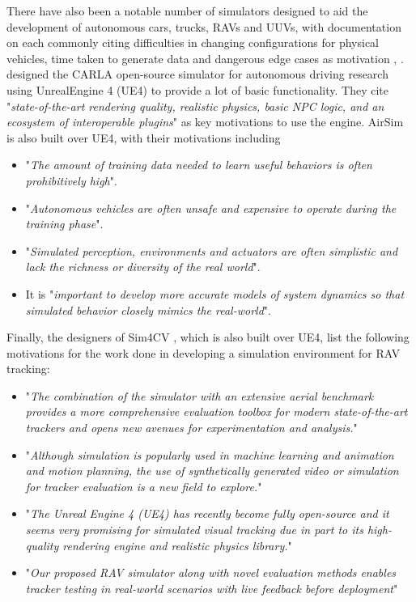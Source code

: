 There have also been a notable number of simulators designed to aid the development of autonomous cars, trucks, RAVs and UUVs, with documentation on each commonly citing difficulties in changing configurations for physical vehicles, time taken to generate data and dangerous edge cases as motivation \cite{Dosovitskiy2017CARLA:Simulator} \cite{Wymann2015TORCS:Simulator}, \cite{Shah2017AirSim:Vehicles} \cite{Bojarski2016EndCars}. \citeauthor{Dosovitskiy2017CARLA:Simulator} designed the CARLA open-source simulator \cite{Dosovitskiy2017CARLA:Simulator} for autonomous driving research using UnrealEngine 4 (UE4) to provide a lot of basic functionality. They cite "\textit{state-of-the-art rendering quality, realistic physics, basic NPC logic, and an ecosystem of interoperable plugins}" as key motivations to use the engine. AirSim \cite{Shah2017AirSim:Vehicles} is also built over UE4, with their motivations including
\begin{itemize}
    \item "\textit{The amount of training data needed to learn useful behaviors is often prohibitively high}".
    \item "\textit{Autonomous vehicles are often unsafe and expensive to operate during the training phase}".
    \item "\textit{Simulated perception, environments and actuators are often simplistic and lack the richness or diversity of the real world}".
    \item It is "\textit{important to develop more accurate models of system dynamics so that simulated behavior closely mimics the real-world}".
\end{itemize}

Finally, the designers of Sim4CV \cite{Mueller2016ATracking}, which is also built over UE4, list the following motivations for the work done in developing a simulation environment for RAV tracking:
\begin{itemize}
    \item "\textit{The combination of the simulator with an extensive aerial benchmark provides a more comprehensive evaluation toolbox for modern state-of-the-art trackers and opens new avenues for experimentation and analysis.}"
    \item {} "\textit{Although simulation is popularly used in machine learning and animation and motion planning, the use of synthetically generated video or simulation for tracker evaluation is a new field to explore.}"
    \item "\textit{The Unreal Engine 4 (UE4) has recently become fully open-source and it seems very promising for simulated visual tracking due in part to its high-quality rendering engine and realistic physics library.}"
    \item "\textit{Our proposed RAV simulator along with novel evaluation methods enables tracker testing in real-world scenarios with live feedback before deployment}"
\end{itemize}

